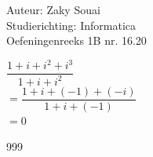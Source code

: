 \documentclass[a4paper]{article}
\begin{document}
  
\noindent \large Auteur: Zaky Souai \\
\noindent \large Studierichting:  Informatica\\
\noindent \large Oefeningenreeks 1B nr. 16.20\\

\bigskip

\normalsize

$\dfrac{1 + i + i^2 + i^3}{1 + i + i^2} $ \\

$= \dfrac{1 + i + (-1) + (-i)}{1 + i + (-1)} $ \\

$= 0 $





\begin{thebibliography}{999}
\end{thebibliography}
\end{document}
